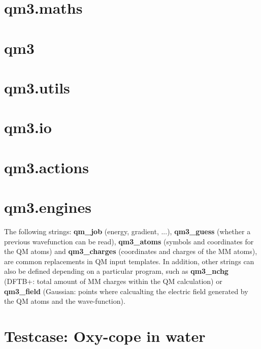 \documentclass[10pt]{article}
\begin{document}
\lhead{} \chead{} \rhead{}
\lfoot{} \cfoot{} \rfoot{\thepage}
\renewcommand{\headrulewidth}{0pt}
\renewcommand{\footrulewidth}{0pt}

\setmainfont{Candara}

\tableofcontents

\newpage

\section{qm3.maths}









\section{qm3}





\section{qm3.utils}







\section{qm3.io}




\section{qm3.actions}










\section{qm3.engines}
The following strings: \textbf{qm\_job} (energy, gradient, ...), \textbf{qm3\_guess} (whether
a previous wavefunction can be read), \textbf{qm3\_atoms} (symbols and coordinates for the QM atoms) and
\textbf{qm3\_charges} (coordinates and charges of the MM atoms), are common replacements
in QM input templates. In addition, other strings can also be defined depending on a particular program,
such as \textbf{qm3\_nchg} (DFTB+: total amount of MM charges within the QM calculation)
or \textbf{qm3\_field} (Gaussian: points where calcualting the electric field generated by
the QM atoms and the wave-function).



























\section{Testcase: Oxy-cope in water}



\end{document}

